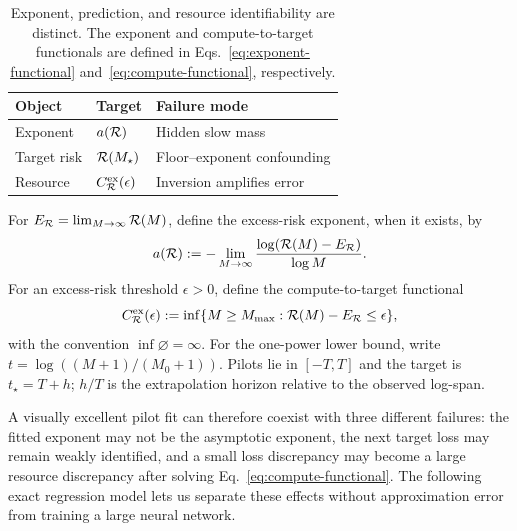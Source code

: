 \begin{table}[t]
\centering
\small
\begin{tabular}{@{}lll@{}}
\toprule
Object & Target & Failure mode \\
\midrule
Exponent & $a(\mathcal{R})$ & Hidden slow mass \\
Target risk & $\mathcal{R}(M_\star)$ & Floor--exponent confounding \\
Resource & $C^{\mathrm{ex}}_{\mathcal{R}}(\epsilon)$ & Inversion amplifies error \\
\bottomrule
\end{tabular}
\caption{Exponent, prediction, and resource identifiability are distinct. The exponent and compute-to-target functionals are defined in Eqs.~\eqref{eq:exponent-functional} and~\eqref{eq:compute-functional}, respectively.}
\label{tab:targets}
\end{table}

For $E_{\mathcal{R}}=\lim_{M\to\infty}\mathcal{R}(M)$, define the excess-risk exponent, when it exists, by
\begin{equation}
 a(\mathcal{R}):=-\lim_{M\to\infty}
 \frac{\log(\mathcal{R}(M)-E_{\mathcal{R}})}{\log M}.
 \label{eq:exponent-functional}
\end{equation}
For an excess-risk threshold $\epsilon>0$, define the compute-to-target functional
\begin{equation}
 C^{\mathrm{ex}}_{\mathcal{R}}(\epsilon)
 :=\inf\{M\ge M_{\max}:\mathcal{R}(M)-E_{\mathcal{R}}\le\epsilon\},
 \label{eq:compute-functional}
\end{equation}
with the convention $\inf\varnothing=\infty$. For the one-power lower bound, write $t=\log((M+1)/(M_0+1))$. Pilots lie in $[-T,T]$ and the target is $t_\star=T+h$; $h/T$ is the extrapolation horizon relative to the observed log-span.

A visually excellent pilot fit can therefore coexist with three different failures: the fitted exponent may not be the asymptotic exponent, the next target loss may remain weakly identified, and a small loss discrepancy may become a large resource discrepancy after solving Eq.~\eqref{eq:compute-functional}. The following exact regression model lets us separate these effects without approximation error from training a large neural network.
